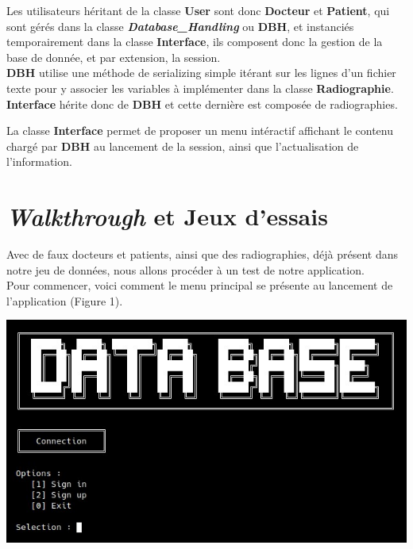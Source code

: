 \documentclass[12pt,a4paper]{article}
\newenvironment{Figure}
{\par\medskip\noindent\minipage{\linewidth}}
{\endminipage\par\medskip}
\begin{document}
\begin{multicols}{2}
Les utilisateurs héritant de la classe \textbf{User} sont donc \textbf{Docteur} et \textbf{Patient}, qui sont gérés dans la classe \textbf{\textit{Database\_Handling}} ou \textbf{DBH}, et instanciés temporairement dans la classe \textbf{Interface}, ils composent donc la gestion de la base de donnée, et par extension, la session. \\
		
\textbf{DBH} utilise une méthode de serializing simple itérant sur les lignes d'un fichier texte pour y associer les variables à implémenter dans la classe \textbf{Radiographie}. \textbf{Interface} hérite donc de \textbf{DBH} et cette dernière est composée de radiographies.
		
La classe \textbf{Interface} permet de proposer un menu intéractif affichant le contenu chargé par \textbf{DBH} au lancement de la session, ainsi que l'actualisation de l'information.
		
\section{\textit{Walkthrough} et Jeux d'essais}
		
Avec de faux docteurs et patients, ainsi que des radiographies, déjà présent dans notre jeu de données, nous allons procéder à un test de notre application. \\
		
Pour commencer, voici comment le menu principal se présente au lancement de l'application (Figure 1). \\
\begin{Figure}
	\centering
	\includegraphics[width=\linewidth]{images/walkthrough/entree.jpg}
	\label{fig:menu_principal}
\end{Figure}
		

\end{multicols}
\end{document}

